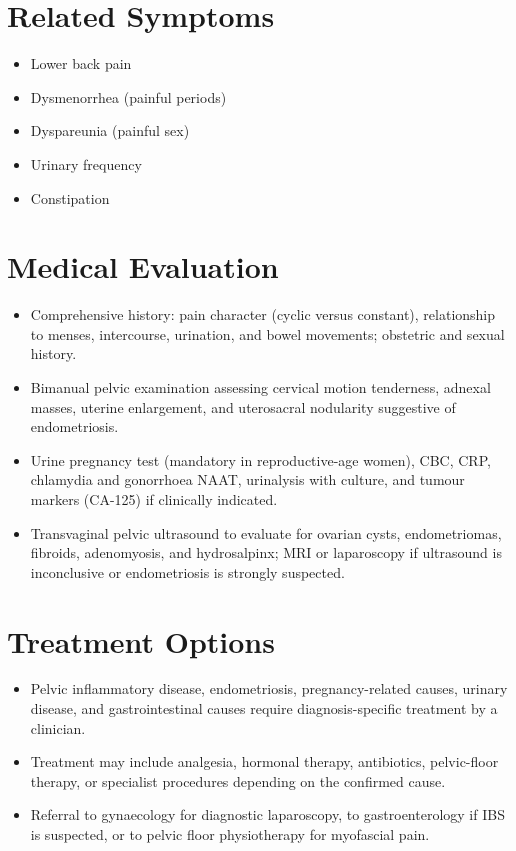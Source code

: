 \section*{Related Symptoms}
\begin{itemize}
  \item Lower back pain
  \item Dysmenorrhea (painful periods)
  \item Dyspareunia (painful sex)
  \item Urinary frequency
  \item Constipation
\end{itemize}

\section*{Medical Evaluation}
\begin{itemize}
  \item Comprehensive history: pain character (cyclic versus constant), relationship to menses, intercourse, urination, and bowel movements; obstetric and sexual history.
  \item Bimanual pelvic examination assessing cervical motion tenderness, adnexal masses, uterine enlargement, and uterosacral nodularity suggestive of endometriosis.
  \item Urine pregnancy test (mandatory in reproductive-age women), CBC, CRP, chlamydia and gonorrhoea NAAT, urinalysis with culture, and tumour markers (CA-125) if clinically indicated.
  \item Transvaginal pelvic ultrasound to evaluate for ovarian cysts, endometriomas, fibroids, adenomyosis, and hydrosalpinx; MRI or laparoscopy if ultrasound is inconclusive or endometriosis is strongly suspected.
\end{itemize}

\section*{Treatment Options}
\begin{itemize}
  \item Pelvic inflammatory disease, endometriosis, pregnancy-related causes, urinary disease, and gastrointestinal causes require diagnosis-specific treatment by a clinician.
  \item Treatment may include analgesia, hormonal therapy, antibiotics, pelvic-floor therapy, or specialist procedures depending on the confirmed cause.
  \item Referral to gynaecology for diagnostic laparoscopy, to gastroenterology if IBS is suspected, or to pelvic floor physiotherapy for myofascial pain.
\end{itemize}

